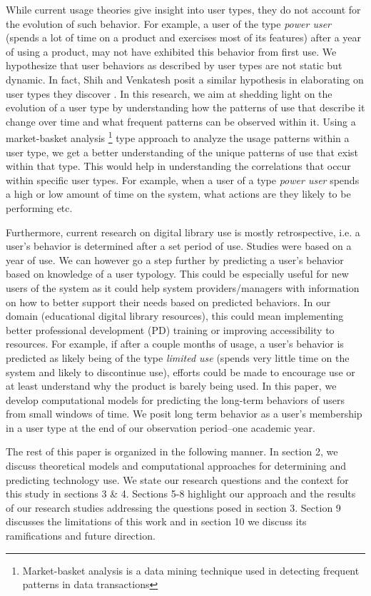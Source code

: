 \documentclass{acm_proc_article-sp}
\begin{document}
While current usage theories give insight into user types, they do not account for the evolution of such behavior. For example, a user of the type \textit{power user} (spends a lot of time on a product and exercises most of its features) after a year of using a product, may not have exhibited this behavior from first use. We hypothesize that user behaviors as described by user types are not static but dynamic. In fact, Shih and Venkatesh posit a similar hypothesis in elaborating on user types they discover \cite{shih2004beyond}. In this research, we aim at shedding light on the evolution of a user type by understanding how the patterns of use that describe it change over time and what frequent patterns can be observed within it. Using a market-basket analysis \footnote{Market-basket analysis is a data mining technique used in detecting frequent patterns in data transactions} type approach to analyze the usage patterns within a user type, we get a better understanding of the unique patterns of use that exist within that type. This would help in understanding the correlations that occur within specific user types. For example, when a user of a type \textit{power user} spends a high or low amount of time on the system, what actions are they likely to be performing etc.

Furthermore, current research on digital library use is mostly retrospective, i.e. a user's behavior is determined after a set period of use. Studies \cite{maullunderstanding,xu} were based on a year of use. We can however go a step further by predicting a user's behavior based on knowledge of a user typology. This could be especially useful for new users of the system as it could help system providers/managers with information on how to better support their needs based on predicted behaviors. In our domain (educational digital library resources), this could mean implementing better professional development (PD) training or improving accessibility to resources. For example, if after a couple months of usage, a user's behavior is predicted as likely being of the type \textit{limited use} (spends very little time on the system and likely to discontinue use), efforts could be made to encourage use or at least understand why the product is barely being used. In this paper, we develop computational models for predicting the long-term behaviors of users from small windows of time. We posit long term behavior as a user's membership in a user type at the end of our observation period--one academic year. 

The rest of this paper is organized in the following manner. In section 2, we discuss theoretical models and computational approaches for determining and predicting technology use. We state our research questions and the context for this study in sections 3 \& 4. Sections 5-8 highlight our approach and the results of our research studies addressing the questions posed in section 3. Section 9 discusses the limitations of this work and in section 10 we discuss its ramifications and future direction.
 
\end{document}
